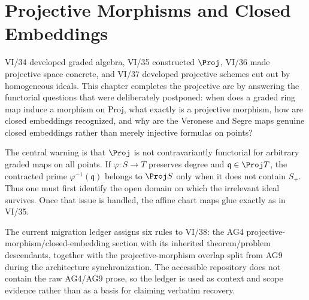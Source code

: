 \chapter{Projective Morphisms and Closed Embeddings}
\label{ch:vi38-projective-morphisms-closed-embeddings}

VI/34 developed graded algebra, VI/35 constructed \(\Proj\), VI/36 made projective space concrete, and VI/37 developed projective schemes cut out by homogeneous ideals.  This chapter completes the projective arc by answering the functorial questions that were deliberately postponed: when does a graded ring map induce a morphism on Proj, what exactly is a projective morphism, how are closed embeddings recognized, and why are the Veronese and Segre maps genuine closed embeddings rather than merely injective formulas on points?

The central warning is that \(\Proj\) is not contravariantly functorial for arbitrary graded maps on all points.  If \(\varphi:S\to T\) preserves degree and \(\mathfrak q\in\Proj T\), the contracted prime \(\varphi^{-1}(\mathfrak q)\) belongs to \(\Proj S\) only when it does not contain \(S_+\).  Thus one must first identify the open domain on which the irrelevant ideal survives.  Once that issue is handled, the affine chart maps glue exactly as in VI/35.

The current migration ledger assigns six rules to VI/38: the AG4 projective-morphism/closed-embedding section with its inherited theorem/problem descendants, together with the projective-morphism overlap split from AG9 during the architecture synchronization.  The accessible repository does not contain the raw AG4/AG9 prose, so the ledger is used as context and scope evidence rather than as a basis for claiming verbatim recovery.

